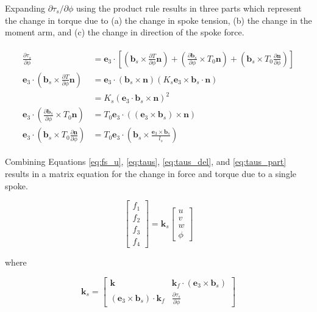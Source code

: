 \documentclass[../thesis.tex]{subfiles}
\newcommand{\eh}{\mathbf{e}_3}
\newcommand{\n}{\mathbf{n}}
\newcommand{\bs}{\mathbf{b}_s}
\begin{document}
Expanding $\partial\tau_s/\partial\phi$ using the product rule results in three parts which represent the change in torque due to (a) the change in spoke tension, (b) the change in the moment arm, and (c) the change in direction of the spoke force.

\begin{align}
\label{eq:taus_part}
\begin{split}
\frac{\partial\tau_s}{\partial\phi} &= \eh\cdot \left[
    \left(\bs\times \frac{\partial T}{\partial\phi}\n\right) +
    \left( \frac{\partial\bs}{\partial\phi} \times T_0\n \right) +
    \left( \bs \times T_0 \frac{\partial\n}{\partial\phi} \right) \right]\\
\eh\cdot\left(\bs\times \frac{\partial T}{\partial\phi}\n\right) &=
    \eh\cdot(\bs\times\n)\left(K_s\eh\times\bs\cdot\n\right)\\
    &= K_s(\eh\cdot\bs\times\n)^2\\
\eh\cdot\left( \frac{\partial\bs}{\partial\phi} \times T_0\n \right) &=
    T_0\eh\cdot((\eh\times\bs)\times\n)\\
\eh\cdot\left( \bs \times T_0 \frac{\partial\n}{\partial\phi} \right) &=
    T_0\eh\cdot\left(\bs \times \frac{\eh\times\bs}{l_s} \right)
\end{split}
\end{align}

Combining Equations \eqref{eq:fs_u}, \eqref{eq:taus}, \eqref{eq:taus_del}, and \eqref{eq:taus_part} results in a matrix equation for the change in force and torque due to a single spoke.

\begin{equation}
\begin{bmatrix}
f_1\\f_2\\f_3\\f_4
\end{bmatrix}
=\mathbf{k}_s
\begin{bmatrix}
u\\v\\w\\\phi
\end{bmatrix}
\end{equation}

where

\begin{equation}
\label{eq:k_s}
\mathbf{k}_s =
\begin{bmatrix}
\mathbf{k}                      & \mathbf{k}_f\cdot(\eh\times\bs)\\
(\eh\times\bs)\cdot\mathbf{k}_f & \frac{\partial\tau_s}{\partial\phi}
\end{bmatrix}
\end{equation}
\end{document}
